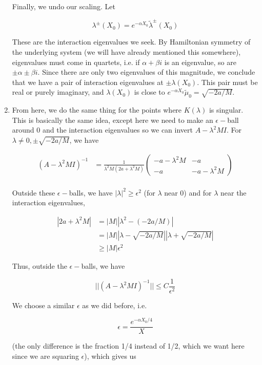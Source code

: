 \documentclass[12pt]{article}
\begin{document}
\begin{enumerate}
Finally, we undo our scaling. Let

\[
\lambda^\pm(X_0) = e^{-\alpha X_0} \tilde{\lambda}^\pm(X_0)
\]

These are the interaction eigenvalues we seek. By Hamiltonian symmetry of the underlying system (we will have already mentioned this somewhere), eigenvalues must come in quartets, i.e. if $\alpha + \beta i$ is an eigenvalue, so are $\pm \alpha \pm \beta i$. Since there are only two eigenvalues of this magnitude, we conclude that we have a pair of interaction eigenvalues at $\pm \lambda(X_0)$. This pair must be real or purely imaginary, and $\lambda(X_0)$ is close to $e^{-\alpha X_0} \tilde{\mu}_0 = \sqrt{-2a/M}$.

\item From here, we do the same thing for the points where $K(\lambda)$ is singular. This is basically the same idea, except here we need to make an $\epsilon-$ball around 0 and the interaction eigenvalues so we can invert $A - \lambda^2 M I$. For $\lambda \neq 0, \pm \sqrt{-2a/M}$, we have

\begin{align*}
(A - \lambda^2 M I)^{-1} &=
\frac{1}{\lambda^2 M(2a + \lambda^2 M)}
\begin{pmatrix}
-a - \lambda^2 M & -a \\
-a & -a - \lambda^2 M
\end{pmatrix} \\
\end{align*}

Outside these $\epsilon-$balls, we have $|\lambda|^2 \geq \epsilon^2$ (for $\lambda$ near 0) and for $\lambda$ near the interaction eigenvalues,

\begin{align*}
|2a + \lambda^2 M| &= |M||\lambda^2 - (-2a/M)| \\
&= |M||\lambda - \sqrt{-2a/M}||\lambda + \sqrt{-2a/M}| \\
&\geq |M| \epsilon^2
\end{align*}

Thus, outside the $\epsilon-$balls, we have

\[
||(A - \lambda^2 M I)^{-1}|| \leq C \frac{1}{\epsilon^2} 
\]

We choose a similar $\epsilon$ as we did before, i.e. 

\[
\epsilon = \frac{e^{-\alpha X_0/4}}{X}
\]

(the only difference is the fraction 1/4 instead of 1/2, which we want here since we are squaring $\epsilon$), which gives us



\end{enumerate}
\end{document}
